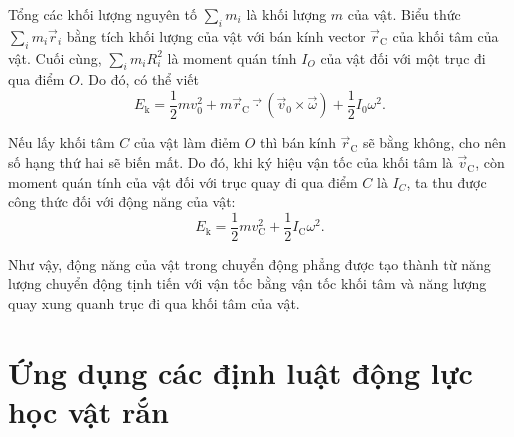 \noindent
Tổng các khối lượng nguyên tố $\sum_i m_i$ là khối lượng $m$ của vật. Biểu thức $\sum_i m_i\vec{r}_i$ bằng tích khối lượng của vật với bán kính vector $\vec{r}_{\text{C}}$ của khối tâm của vật. Cuối cùng, $\sum_i m_iR_i^2$ là moment quán tính $I_O$ của vật đối với một trục đi qua điểm $O$. Do đó, có thể viết
\begin{equation}\label{eq:5_54}
	E_{\text{k}} = \frac{1}{2} mv_0^2 + m\vec{r}_{\text{C}}\vec{\cdot}(\vec{v}_0\times\vec{\omega}) + \frac{1}{2} I_0\omega^2.
\end{equation}

Nếu lấy khối tâm $C$ của vật làm điẻm $O$ thì bán kính $\vec{r}_{\text{C}}$ sẽ bằng không, cho nên số hạng thứ hai sẽ biến mất. Do đó, khi ký hiệu vận tốc của khối tâm là $\vec{v}_{\text{C}}$, còn moment quán tính của vật đối với trục quay đi qua điểm $C$ là $I_C$, ta thu được công thức đối với động năng của vật:
\begin{equation}\label{eq:5_55}
	E_{\text{k}} = \frac{1}{2}m v_{\text{C}}^2 + \frac{1}{2} I_{\text{C}} \omega^2.
\end{equation}

Như vậy, động năng của vật trong chuyển động phẳng được tạo thành từ năng lượng chuyển động tịnh tiến với vận tốc bằng vận tốc khối tâm và năng lượng quay xung quanh trục đi qua khối tâm của vật.

\section{Ứng dụng các định luật động lực học vật rắn}\label{sec:5_8}

